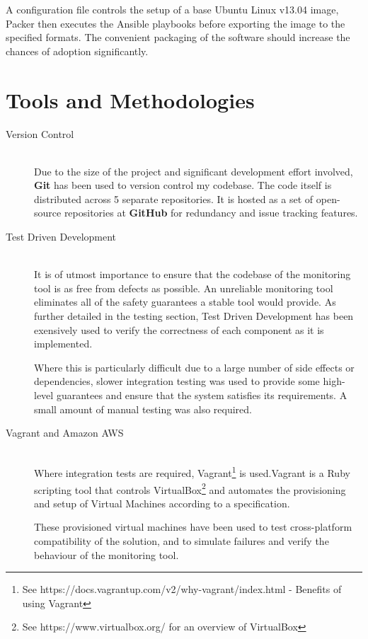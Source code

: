 \documentclass{cshonours}
\begin{document}
A configuration file controls the setup of a base Ubuntu Linux v13.04 image, Packer then executes the Ansible playbooks before exporting the image to the specified formats. The convenient packaging of the software should increase the chances of adoption significantly.

\pagebreak
\section{Tools and Methodologies}
\begin{description}
  \item [Version Control]\hfill \\
    Due to the size of the project and significant development effort involved, \textbf{Git} has been used to version control my codebase. The code itself is distributed across 5 separate repositories. It is hosted as a set of open-source repositories at \textbf{GitHub} for redundancy and issue tracking features.

  \item [Test Driven Development]\hfill \\
    It is of utmost importance to ensure that the codebase of the monitoring tool is as free from defects as possible. An unreliable monitoring tool eliminates all of the safety guarantees a stable tool would provide. As further detailed in the testing section, Test Driven Development has been exensively used to verify the correctness of each component as it is implemented.

    Where this is particularly difficult due to a large number of side effects or dependencies, slower integration testing was used to provide some high-level guarantees and ensure that the system satisfies its requirements. A small amount of manual testing was also required.
  \item [Vagrant and Amazon AWS]\hfill \\
    Where integration tests are required, Vagrant\footnote{See
    https://docs.vagrantup.com/v2/why-vagrant/index.html - Benefits of using Vagrant} is used.Vagrant is a Ruby scripting tool that controls
    VirtualBox\footnote{See https://www.virtualbox.org/ for an overview of VirtualBox} and automates the provisioning and setup of Virtual Machines according to a specification.

    These provisioned virtual machines have been used to test cross-platform compatibility of the solution, and to simulate failures and verify the behaviour of the monitoring tool.
\end{description}
\end{document}
